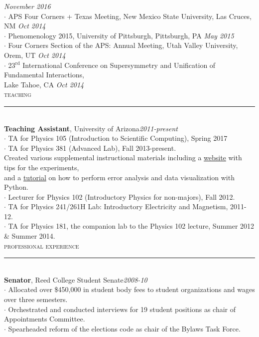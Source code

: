 \documentclass[10pt]{report}
\newcommand{\HRule}{\rule[2mm]{\linewidth}{0.1mm}}
\begin{document}
\hfill \textit{\small November 2016}\\
\small $\cdot$ APS Four Corners + Texas Meeting, New Mexico State University, Las Cruces, NM
\hfill \textit{\small Oct 2014}\\
\small $\cdot$ Phenomenology 2015, University of Pittsburgh, Pittsburgh, PA
\hfill \textit{\small May 2015}\\
\small $\cdot$ Four Corners Section of the APS: Annual Meeting, Utah Valley University, Orem, UT
\hfill \textit{\small Oct 2014}\\
\small $\cdot$ 23$^{\text{rd}}$ International Conference on Supersymmetry and Unification of Fundamental Interactions,\\ 
Lake Tahoe, CA 
\hfill \textit{\small Oct 2014}\\
\newpage
\large\textsc{teaching}\\
\HRule\\
\normalsize\textsf{\textbf{Teaching Assistant}}, \textsf{\normalsize University of Arizona}\hfill\textit{\small 2011-present}\\
\small $\cdot$ TA for Physics 105 (Introduction to Scientific Computing), Spring 2017\\
\small $\cdot$ TA for Physics 381 (Advanced Lab), Fall 2013-present.\\
\indent Created various supplemental instructional materials including a \href{http://www.physics.arizona.edu/~adarsh/teaching/phys381}{website} with tips for the experiments,\\  
\indent and a \href{http://www.physics.arizona.edu/~adarsh/teaching/phys381/Error\_Analysis\_Notebook/index.html}{tutorial} on how to perform error analysis and data visualization with Python.\\
\small $\cdot$ Lecturer for Physics 102 (Introductory Physics for non-majors), Fall 2012.\\
$\cdot$ TA for Physics 241/261H Lab: Introductory Electricity and Magnetism, 2011-12.\\
$\cdot$ TA for Physics 181, the companion lab to the Physics 102 lecture, Summer 2012 \& Summer 2014.\\


\large\textsc{professional experience}\\
\HRule\\
\normalsize \textsf{\textbf{Senator}}, \textsf{\normalsize Reed College Student Senate}\hfill\textit{\small 2008-10}\\
\small $\cdot$ Allocated over \$450,000 in student body fees to student organizations and wages over three semesters.\\
$\cdot$ Orchestrated and conducted interviews for 19 student positions as chair of Appointments Committee.\\
$\cdot$ Spearheaded reform of the elections code as chair of the Bylaws Task Force.
\end{document}
